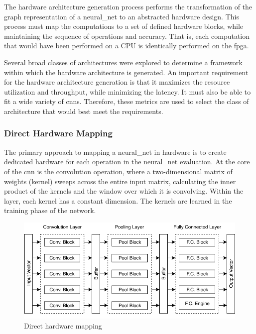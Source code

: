 \documentclass{uw-ece-wkrpt}
\begin{document}
The hardware architecture generation process performs the transformation of the graph representation of a \gls{neural_net} to an abstracted hardware design. This process must map the computations to a set of defined hardware blocks, while maintaining the sequence of operations and accuracy. That is, each computation that would have been performed on a CPU is identically performed on the \gls{fpga}.

Several broad classes of architectures were explored to determine a framework within which the hardware architecture is generated. An important requirement for the hardware architecture generation is that it maximizes the resource utilization and throughput, while minimizing the latency. It must also be able to fit a wide variety of \glspl{cnn}. Therefore, these metrics are used to select the class of architecture that would best meet the requirements.

\subsubsection{Direct Hardware Mapping}

The primary approach to mapping a \gls{neural_net} in hardware is to create dedicated hardware for each operation in the \gls{neural_net} evaluation. At the core of the \gls{cnn} is the convolution operation, where a two-dimensional matrix of weights (\gls{kernel}) sweeps across the entire input matrix, calculating the inner product of the kernels and the window over which it is convolving. Within the layer, each \gls{kernel} has a constant dimension. The kernels are learned in the training phase of the network.

\begin{figure}
    \centering
    \includegraphics{figures/direct_hardware_mapping}
    \caption{Direct hardware mapping \cite{Abdelouahab2017Hardware-Automa}}\label{fig:direct_hardware_mapping}
\end{figure}
\end{document}
